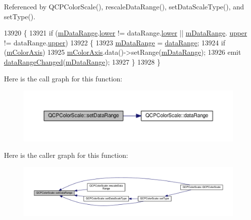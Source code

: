 Referenced by Q\+C\+P\+Color\+Scale(), rescale\+Data\+Range(), set\+Data\+Scale\+Type(), and set\+Type().


\begin{DoxyCode}
13920 \{
13921   \textcolor{keywordflow}{if} (\hyperlink{class_q_c_p_color_scale_a5d4853feb32cd0077bb2b871687c844b}{mDataRange}.\hyperlink{class_q_c_p_range_aa3aca3edb14f7ca0c85d912647b91745}{lower} != dataRange.\hyperlink{class_q_c_p_range_aa3aca3edb14f7ca0c85d912647b91745}{lower} || \hyperlink{class_q_c_p_color_scale_a5d4853feb32cd0077bb2b871687c844b}{mDataRange}.
      \hyperlink{class_q_c_p_range_ae44eb3aafe1d0e2ed34b499b6d2e074f}{upper} != dataRange.\hyperlink{class_q_c_p_range_ae44eb3aafe1d0e2ed34b499b6d2e074f}{upper})
13922   \{
13923     \hyperlink{class_q_c_p_color_scale_a5d4853feb32cd0077bb2b871687c844b}{mDataRange} = \hyperlink{class_q_c_p_color_scale_a52134696d5e04074fff4227d92d96f7b}{dataRange};
13924     \textcolor{keywordflow}{if} (\hyperlink{class_q_c_p_color_scale_a2efbc90fd31898fe05d2b74a8422b1d5}{mColorAxis})
13925       \hyperlink{class_q_c_p_color_scale_a2efbc90fd31898fe05d2b74a8422b1d5}{mColorAxis}.data()->setRange(\hyperlink{class_q_c_p_color_scale_a5d4853feb32cd0077bb2b871687c844b}{mDataRange});
13926     emit \hyperlink{class_q_c_p_color_scale_a293176da9447ec6819be1d901966a257}{dataRangeChanged}(\hyperlink{class_q_c_p_color_scale_a5d4853feb32cd0077bb2b871687c844b}{mDataRange});
13927   \}
13928 \}
\end{DoxyCode}


Here is the call graph for this function\+:\nopagebreak
\begin{figure}[H]
\begin{center}
\leavevmode
\includegraphics[width=350pt]{class_q_c_p_color_scale_abe88633003a26d1e756aa74984587fef_cgraph}
\end{center}
\end{figure}




Here is the caller graph for this function\+:\nopagebreak
\begin{figure}[H]
\begin{center}
\leavevmode
\includegraphics[width=350pt]{class_q_c_p_color_scale_abe88633003a26d1e756aa74984587fef_icgraph}
\end{center}
\end{figure}


